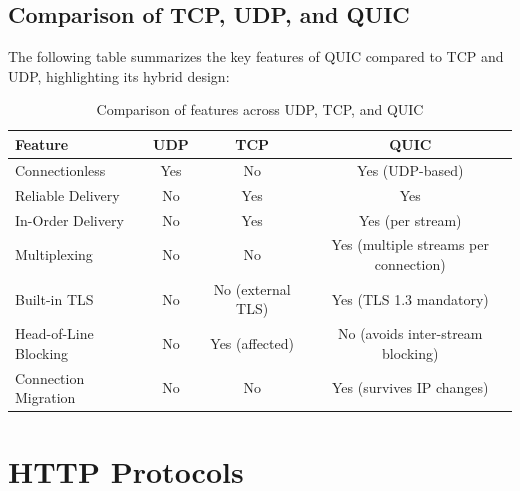 \subsection{Comparison of TCP, UDP, and QUIC}

The following table summarizes the key features of QUIC compared to TCP and UDP, highlighting its hybrid design:

\begin{table}[H]
\centering
\begin{tabular}{|p{4cm}|c|c|c|}
\hline
\textbf{Feature} & \textbf{UDP} & \textbf{TCP} & \textbf{QUIC} \\
\hline
Connectionless & Yes & No & Yes (UDP-based) \\
\hline
Reliable Delivery & No & Yes & Yes \\
\hline
In-Order Delivery & No & Yes & Yes (per stream) \\
\hline
Multiplexing & No & No & Yes (multiple streams per connection) \\
\hline
Built-in TLS & No & No (external TLS) & Yes (TLS 1.3 mandatory) \\
\hline
Head-of-Line Blocking & No & Yes (affected) & No (avoids inter-stream blocking) \\
\hline
Connection Migration & No & No & Yes (survives IP changes) \\
\hline
\end{tabular}
\caption{Comparison of features across UDP, TCP, and QUIC}
\label{tab:tcp-udp-quic-comparison}
\end{table}



\section{HTTP Protocols}

